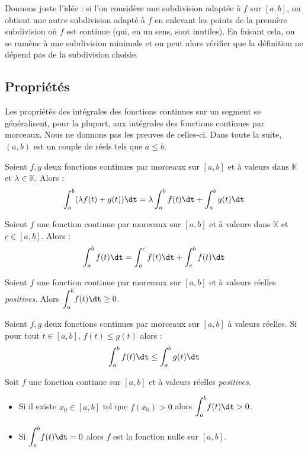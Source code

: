 \documentclass[a4paper,10pt]{report}
\newcommand{\Int}[2]{\ensuremath{\mathchoice%
	{{\displaystyle\int_{#1}^{#2}}}
	{{\displaystyle\int_{#1}^{#2}}}
	{\int_{#1}^{#2}}
	{\int_{#1}^{#2}}
	}}
\begin{document}
\begin{preuve} Donnons juste l'idée : si l'on considère une subdivision adaptée à $f$ sur $[a,b]$, on obtient une autre subdivision adapté à $f$ en \og enlevant \fg les points de la première subdivision où $f$ est continue (qui, en un sens, sont inutiles). En faisant cela, on se ramène à une subdivision \og minimale \fg et on peut alors vérifier que la définition ne dépend pas de la subdivision choisie.
\end{preuve}

\subsection{Propriétés}

\noindent Les propriétés des intégrales des fonctions continues sur un segment se généralisent, pour la plupart, aux intégrales des fonctions continues par morceaux. Nous ne donnons pas les preuves de celles-ci. Dans toute la suite, $(a,b)$ est un couple de réels tels que $a \leq b$.

\begin{prop}[Linéarité] Soient $f,g$ deux fonctions continues par morceaux sur $[a,b]$ et à valeurs dans $\mathbb{K}$ et $\lambda \in \mathbb{K}$. Alors :
$$ \int_{a}^b (\lambda f(t) + g(t)) \dt = \lambda \int_{a}^b  f(t) \dt +  \int_{a}^b  g(t) \dt$$
\end{prop}

\begin{prop} Soient $f$ une fonction continue par morceaux sur $[a,b]$ et à valeurs dans $\mathbb{K}$ et $c \in [a,b]$. Alors :
$$ \int_{a}^b f(t) \dt = \int_{a}^c f(t) \dt + \int_{c}^b f(t) \dt $$
\end{prop}

\begin{prop}[Positivité] Soient $f$ une fonction continue par morceaux sur $[a,b]$ et à valeurs réelles \textit{positives}. Alors $\Int{a}{b} f(t) \dt \geq 0$.
\end{prop}

\begin{prop}[Croissance] Soient $f,g$ deux fonctions continues par morceaux sur $[a,b]$ à valeurs réelles. Si pour tout $t \in [a,b]$, $f(t) \leq g(t)$ alors :
$$\int_{a}^{b} f(t) \dt  \leq \int_{a}^{b} g(t) \dt $$
\end{prop}

\begin{prop}  Soit $f$ une fonction continue sur $[a,b]$ et à valeurs réelles \textit{positives}. 

\begin{itemize}
\item Si il existe $x_0 \in [a,b]$ tel que $f(x_0)>0$ alors $\Int{a}{b} f(t) \dt>0$.
\item Si $\Int{a}{b} f(t) \dt =0$ alors $f$ est la fonction nulle sur $[a,b]$.
\end{itemize}
\end{prop}
\end{document}
